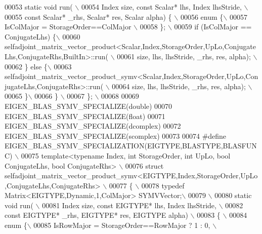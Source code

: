 \begin{DoxyCode}
00053 \textcolor{preprocessor}{static void run( \(\backslash\)}
00054 \textcolor{preprocessor}{  Index size, const Scalar*  lhs, Index lhsStride, \(\backslash\)}
00055 \textcolor{preprocessor}{  const Scalar* \_rhs, Scalar* res, Scalar alpha) \{ \(\backslash\)}
00056 \textcolor{preprocessor}{    enum \{\(\backslash\)}
00057 \textcolor{preprocessor}{      IsColMajor = StorageOrder==ColMajor \(\backslash\)}
00058 \textcolor{preprocessor}{    \}; \(\backslash\)}
00059 \textcolor{preprocessor}{    if (IsColMajor == ConjugateLhs) \{\(\backslash\)}
00060 \textcolor{preprocessor}{     
       selfadjoint\_matrix\_vector\_product<Scalar,Index,StorageOrder,UpLo,ConjugateLhs,ConjugateRhs,BuiltIn>::run( \(\backslash\)}
00061 \textcolor{preprocessor}{        size, lhs, lhsStride, \_rhs, res, alpha);  \(\backslash\)}
00062 \textcolor{preprocessor}{    \} else \{\(\backslash\)}
00063 \textcolor{preprocessor}{     
       selfadjoint\_matrix\_vector\_product\_symv<Scalar,Index,StorageOrder,UpLo,ConjugateLhs,ConjugateRhs>::run( \(\backslash\)}
00064 \textcolor{preprocessor}{        size, lhs, lhsStride, \_rhs, res, alpha);  \(\backslash\)}
00065 \textcolor{preprocessor}{    \}\(\backslash\)}
00066 \textcolor{preprocessor}{  \} \(\backslash\)}
00067 \textcolor{preprocessor}{\}; \(\backslash\)}
00068 \textcolor{preprocessor}{}
00069 EIGEN\_BLAS\_SYMV\_SPECIALIZE(\textcolor{keywordtype}{double})
00070 EIGEN\_BLAS\_SYMV\_SPECIALIZE(\textcolor{keywordtype}{float})
00071 EIGEN\_BLAS\_SYMV\_SPECIALIZE(dcomplex)
00072 EIGEN\_BLAS\_SYMV\_SPECIALIZE(scomplex)
00073 
00074 \textcolor{preprocessor}{#define EIGEN\_BLAS\_SYMV\_SPECIALIZATION(EIGTYPE,BLASTYPE,BLASFUNC) \(\backslash\)}
00075 \textcolor{preprocessor}{template<typename Index, int StorageOrder, int UpLo, bool ConjugateLhs, bool ConjugateRhs> \(\backslash\)}
00076 \textcolor{preprocessor}{struct selfadjoint\_matrix\_vector\_product\_symv<EIGTYPE,Index,StorageOrder,UpLo,ConjugateLhs,ConjugateRhs> \(\backslash\)}
00077 \textcolor{preprocessor}{\{ \(\backslash\)}
00078 \textcolor{preprocessor}{typedef Matrix<EIGTYPE,Dynamic,1,ColMajor> SYMVVector;\(\backslash\)}
00079 \textcolor{preprocessor}{\(\backslash\)}
00080 \textcolor{preprocessor}{static void run( \(\backslash\)}
00081 \textcolor{preprocessor}{Index size, const EIGTYPE*  lhs, Index lhsStride, \(\backslash\)}
00082 \textcolor{preprocessor}{const EIGTYPE* \_rhs, EIGTYPE* res, EIGTYPE alpha) \(\backslash\)}
00083 \textcolor{preprocessor}{\{ \(\backslash\)}
00084 \textcolor{preprocessor}{  enum \{\(\backslash\)}
00085 \textcolor{preprocessor}{    IsRowMajor = StorageOrder==RowMajor ? 1 : 0, \(\backslash\)}

\end{DoxyCode}
